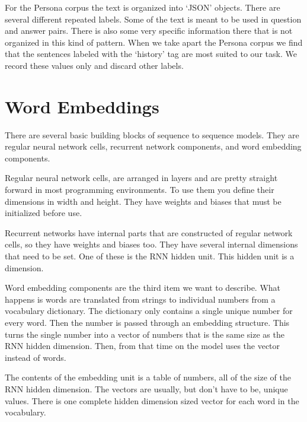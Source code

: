 For the Persona corpus the text is organized into `JSON' objects. There
are several different repeated labels. Some of the text is meant to be used in question and answer pairs. There is also some very specific information there that is not
organized in this kind of pattern. When we take apart the Persona corpus
we find that the sentences labeled with the `history' tag are most suited to our task.
We record these values only and discard other labels.



\section{Word Embeddings}

There are several basic building blocks of sequence to sequence models. 
They are regular neural network cells, recurrent
network components, and word embedding components.

Regular neural network cells, are arranged in layers and are pretty
straight forward in most programming environments. To use them you
define their dimensions in width and height. They have weights and
biases that must be initialized before use.

Recurrent networks have internal parts that are constructed of regular
network cells, so they have weights and biases too. They have several
internal dimensions that need to be set. One of these is the RNN hidden
unit. This hidden unit is a dimension.

Word embedding components are the third item we want to describe.
What happens is words are translated from strings to individual numbers
from a vocabulary dictionary. The dictionary only contains a single
unique number for every word. Then the number is passed through an
embedding structure. This turns the single number into a vector of
numbers that is the same size as the RNN hidden dimension. Then, from
that time on the model uses the vector instead of words.

The contents of the embedding unit is a table of numbers, all of the
size of the RNN hidden dimension. The vectors are usually, but don\textquoteright t
have to be, unique values. There is one complete hidden dimension
sized vector for each word in the vocabulary. 

